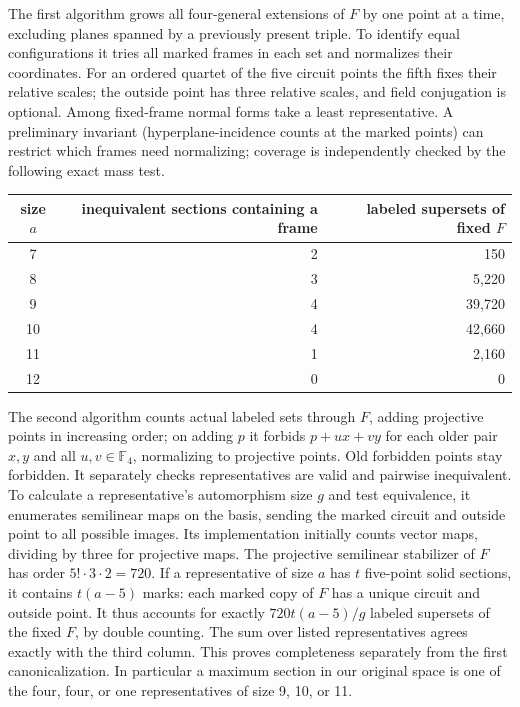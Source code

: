 \documentclass[10pt]{article}
\newcommand{\F}{\mathbb F}
\begin{document}
The first algorithm grows all four-general extensions of $F$ by one point at a time, excluding planes spanned by a previously present triple. To identify equal configurations it tries all marked frames in each set and normalizes their coordinates. For an ordered quartet of the five circuit points the fifth fixes their relative scales; the outside point has three relative scales, and field conjugation is optional. Among fixed-frame normal forms take a least representative. A preliminary invariant (hyperplane-incidence counts at the marked points) can restrict which frames need normalizing; coverage is independently checked by the following exact mass test.
\begin{center}
\begin{tabular}{c r r}
\toprule size $a$ & inequivalent sections containing a frame & labeled supersets of fixed $F$\\\midrule
7&2&150\\8&3&5,220\\9&4&39,720\\10&4&42,660\\11&1&2,160\\12&0&0\\\bottomrule
\end{tabular}
\end{center}
The second algorithm counts actual labeled sets through $F$, adding projective points in increasing order; on adding $p$ it forbids $p+u x+v y$ for each older pair $x,y$ and all $u,v\in\F_4$, normalizing to projective points. Old forbidden points stay forbidden. It separately checks representatives are valid and pairwise inequivalent. To calculate a representative's automorphism size $g$ and test equivalence, it enumerates semilinear maps on the basis, sending the marked circuit and outside point to all possible images. Its implementation initially counts vector maps, dividing by three for projective maps. The projective semilinear stabilizer of $F$ has order $5!\cdot3\cdot2=720$. If a representative of size $a$ has $t$ five-point solid sections, it contains $t(a-5)$ marks: each marked copy of $F$ has a unique circuit and outside point. It thus accounts for exactly $720t(a-5)/g$ labeled supersets of the fixed $F$, by double counting. The sum over listed representatives agrees exactly with the third column. This proves completeness separately from the first canonicalization. In particular a maximum section in our original space is one of the four, four, or one representatives of size 9, 10, or 11.
\end{document}
